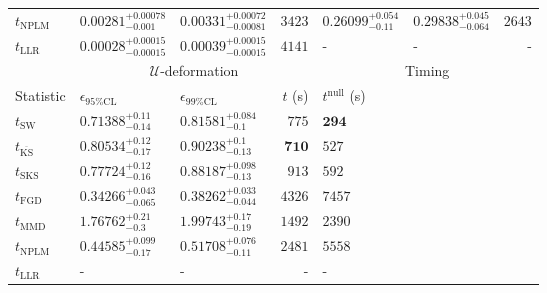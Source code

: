 \begin{tabular}{l|llr|llr}
\rowcolor{red!35}	$t_{\mathrm{NPLM}}$ & $0.00281_{-0.001}^{+0.00078}$ & $0.00331_{-0.00081}^{+0.00072}$ & $3423$ & $0.26099_{-0.11}^{+0.054}$ & $0.29838_{-0.064}^{+0.045}$ & $2643$ \\
	$t_{\mathrm{LLR}}$ & $0.00028_{-0.00015}^{+0.00015}$ & $0.00039_{-0.00015}^{+0.00015}$ & $4141$ & - & - & - \\
	\toprule
	\multicolumn{1}{c}{} & \multicolumn{3}{c}{$\mathcal{U}$-deformation} & \multicolumn{3}{c}{Timing} \\
	Statistic & $\epsilon_{95\%\mathrm{CL}}$ & $\epsilon_{99\%\mathrm{CL}}$ & $t$ (s) & $t^{\mathrm{null}}$ (s) \\
	\midrule
	$t_{\mathrm{SW}}$ & $0.71388_{-0.14}^{+0.11}$ & $0.81581_{-0.1}^{+0.084}$ & $775$ & ${\mathbf{294}}$ \\
	$t_{\overline{\mathrm{KS}}}$ & $0.80534_{-0.17}^{+0.12}$ & $0.90238_{-0.13}^{+0.1}$ & ${\mathbf{710}}$ & $527$ \\
	$t_{\mathrm{SKS}}$ & $0.77724_{-0.16}^{+0.12}$ & $0.88187_{-0.13}^{+0.098}$ & $913$ & $592$ \\
	$t_{\mathrm{FGD}}$ & ${\mathbf{0.34266_{-0.065}^{+0.043}}}$ & ${\mathbf{0.38262_{-0.044}^{+0.033}}}$ & $4326$ & $7457$ \\
	$t_{\mathrm{MMD}}$ & $1.76762_{-0.3}^{+0.21}$ & $1.99743_{-0.19}^{+0.17}$ & $1492$ & $2390$ \\
\rowcolor{red!35}	$t_{\mathrm{NPLM}}$ & $0.44585_{-0.17}^{+0.099}$ & $0.51708_{-0.11}^{+0.076}$ & $2481$ & $5558$ \\
	$t_{\mathrm{LLR}}$ & - & - & - & - \\
	\bottomrule
\end{tabular}